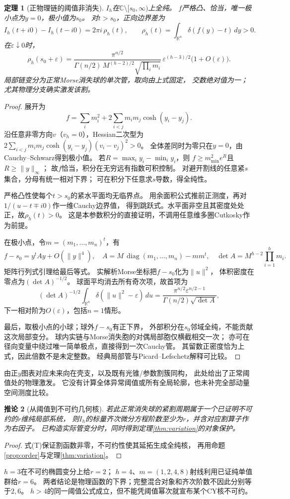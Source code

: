 \documentclass[11pt,a4paper]{ctexart}
\theoremstyle{cnplain}\newtheorem{theorem}{定理}[section]
\newtheorem{corollary}[theorem]{推论}
\theoremstyle{definition}\newtheorem{definition}[theorem]{定义}
\theoremstyle{remark}\newtheorem{remark}[theorem]{注}
\begin{document}
\begin{theorem}[正物理链的阈值非消失]\label{thm:threshold}
$I_h$在$\mathbb C\setminus[s_0,\infty)$上全纯。
$f$严格凸、恰当，唯一极小点为$y=0$，极小值为$s_0$。
对$t>s_0$，正向边界差为
\[
 I_h(t+i0)-I_h(t-i0)=2\pi i\,\rho_h(t),\qquad
 \rho_h(t)=\int_{\mathbb R^n}\delta(f(y)-t)\,dy>0.
\]
在$\varepsilon\downarrow0$时，
\[
 \rho_h(s_0+\varepsilon)=
 \frac{\pi^{n/2}}
 {\Gamma(n/2)\,M^{(h-2)/2}\sqrt{\prod_i m_i}}\,
 \varepsilon^{(h-3)/2}\bigl(1+O(\varepsilon)\bigr).
 \tag{T}
\]
局部链变分为正常Morse消失球的单次管，取向由上式固定，
交数绝对值为一；尤其物理分支确实激发该割。
\end{theorem}
\begin{proof}
展开为
\[
 f=\sum_i m_i^2+2\sum_{i<j}m_i m_j\cosh(y_i-y_j).
\]
沿任意非零方向$v$（$v_h=0$），Hessian二次型为
$2\sum_{i<j}m_i m_j\cosh(y_i-y_j)(v_i-v_j)^2>0$。
全体差同时为零只在$y=0$，由Cauchy--Schwarz得到极小值。
若$R=\max_i y_i-\min_i y_i$，则
$f\ge m_{\min}^2e^R$且$R\ge\|y\|_\infty$；
故$f$恰当，积分在无穷远有指数可积控制。
对避开割线的任意紧$s$集合，分母有统一相对下界；
可在积分下任意求$s$导数，得全纯性。

严格凸性使每个$t>s_0$的紧水平面均无临界点。
用余面积公式推前正测度，再对$1/(u-t\mp i0)$作一维Cauchy边界值，
得到跳跃式。水平面非空且其密度处处正，故$\rho_h(t)>0$。
这是本参数积分的直接证明，不调用任意维多圈Cutkosky作为前提。

在极小点，令$m=(m_1,\ldots,m_n)^t$，有
\[
 f-s_0=y^tAy+O(\|y\|^4),\quad
 A=M\,\operatorname{diag}(m_1,\ldots,m_n)-mm^t,
 \quad \det A=M^{h-2}\prod_{i=1}^h m_i.
\]
矩阵行列式引理给最后等式。
实解析Morse坐标把$f-s_0$化为$\|u\|^2$，
体积密度在零点为$(\det A)^{-1/2}$。
球面平均消去所有奇次项，故首项为
\[
 (\det A)^{-1/2}
 \int_{\mathbb R^n}\delta(\|u\|^2-\varepsilon)\,du
 =\frac{\pi^{n/2}\varepsilon^{n/2-1}}
 {\Gamma(n/2)\sqrt{\det A}},
\]
下一相对阶为$O(\varepsilon)$，包括$n=1$情形。

最后，取极小点的小球；球外$f-s_0$有正下界，
外部积分在$s_0$邻域全纯，不能贡献这次局部变分。
球内实链与Morse消失胞的对偶局部胞仅横截相交一次；
亦可在径向变量中绕过唯一简单极点，直接得到一次Cauchy管。
其留数正密度恰为上式，因此倍数不是未定整数。
经典局部管与Picard--Lefschetz解释可比较\cite[\S2.3]{muhl}。
\end{proof}
由正$y$图表对应未来向在壳支，以及既有光锥/参数割簇同构，
此处给出了正常阈值处的物理激发。
它没有计算全体异常阈值或所有全局轮廓，也未补完全部动量空间测度比较。

\begin{corollary}[从阈值到不可约几何核]\label{cor:banana-threshold}
若此正常消失球的紧割周期属于一个已证明不可约的$r$维纯局部系统，
则$I_h$的标量齐次微分方程阶数至少为$r$，并含对应割算子作为右因子。
已构造实际管变分时，同时得到定理\ref{thm:variation}的对象保护。
\end{corollary}
\begin{proof}
式(T)保证割函数非零，不可约性使其延拓生成全纯核，
再用命题\ref{prop:order}与定理\ref{thm:variation}。
\end{proof}
$h=3$在不可约椭圆变分上给$r=2$；
$h=4$、$m=(1,2,4,8)$射线利用已证纯单值群给$r=6$。
两者结论是物理函数的下界；完整混合对象和齐次阶数不因此分别等于$2,6$。
$h>4$的同一阈值公式成立，但不能凭阈值幂次就宣布某个CY核不可约。
\end{document}
